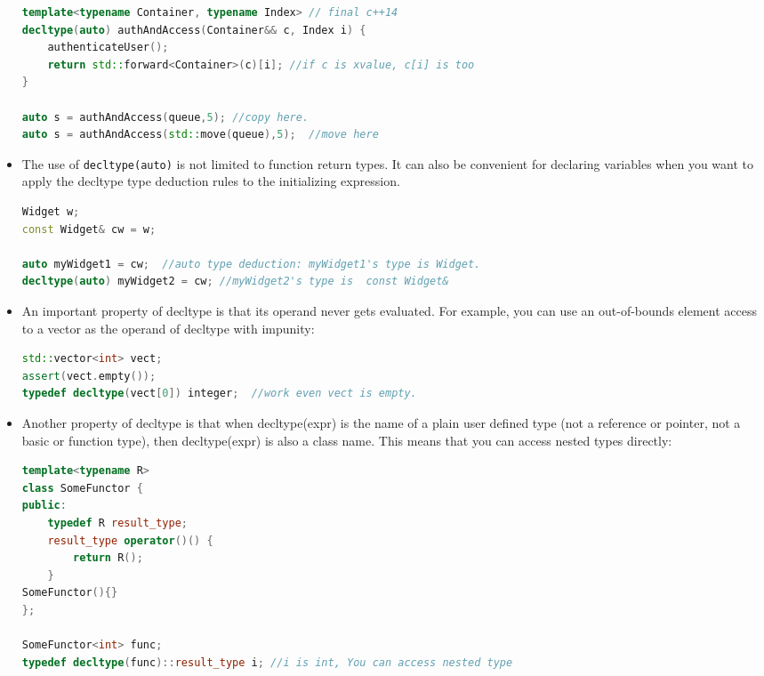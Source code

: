 \documentclass[a4paper,11pt,twoside]{book}
\begin{document}
\begin{itemize}
\begin{lstlisting}[frame=single, language=c++, mathescape=true]
template<typename Container, typename Index> // final c++14
decltype(auto) authAndAccess(Container&& c, Index i) {
	authenticateUser();
	return std::forward<Container>(c)[i]; //if c is xvalue, c[i] is too
}

auto s = authAndAccess(queue,5); //copy here.
auto s = authAndAccess(std::move(queue),5);  //move here
\end{lstlisting}
	
	\item The use of \texttt{decltype(auto)} is not limited to function return types. It can also be convenient for declaring variables when you want to apply the decltype type deduction rules to the initializing expression.
\begin{lstlisting}[frame=single, language=c++, mathescape=true]
Widget w;
const Widget& cw = w;

auto myWidget1 = cw;  //auto type deduction: myWidget1's type is Widget.
decltype(auto) myWidget2 = cw; //myWidget2's type is  const Widget&
\end{lstlisting}
	
	\item An important property of decltype is that its operand never gets evaluated. For example, you can use an out-of-bounds element access to a vector as the operand of decltype with impunity:
	
\begin{lstlisting}[frame=single, language=c++, mathescape=true]
std::vector<int> vect;
assert(vect.empty());
typedef decltype(vect[0]) integer;  //work even vect is empty.
\end{lstlisting}
	
	\item Another property of decltype is that when decltype(expr) is the name of a plain user defined type (not a reference or pointer, not a basic or function type), then decltype(expr) is also a class name. This means that you can access nested types directly:
\begin{lstlisting}[frame=single, language=c++, mathescape=true]
template<typename R>
class SomeFunctor {
public:
	typedef R result_type;
	result_type operator()() {
		return R();
	}
SomeFunctor(){}
};

SomeFunctor<int> func;
typedef decltype(func)::result_type i; //i is int, You can access nested type
\end{lstlisting}
	

\end{itemize}
\end{document}
